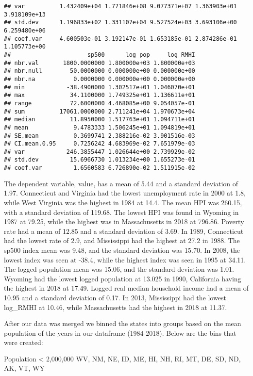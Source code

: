 \documentclass[
]{article}
\begin{document}
\begin{verbatim}
## var          1.432409e+04 1.771846e+08 9.077371e+07 1.363903e+01 3.918109e+13
## std.dev      1.196833e+02 1.331107e+04 9.527524e+03 3.693106e+00 6.259480e+06
## coef.var     4.600503e-01 3.192147e-01 1.653185e-01 2.874286e-01 1.105773e+00
##                      sp500      log_pop     log_RMHI
## nbr.val       1800.0000000 1.800000e+03 1.800000e+03
## nbr.null        50.0000000 0.000000e+00 0.000000e+00
## nbr.na           0.0000000 0.000000e+00 0.000000e+00
## min            -38.4900000 1.302517e+01 1.046070e+01
## max             34.1100000 1.749325e+01 1.136611e+01
## range           72.6000000 4.468085e+00 9.054057e-01
## sum          17061.0000000 2.711241e+04 1.970673e+04
## median          11.8950000 1.517763e+01 1.094711e+01
## mean             9.4783333 1.506245e+01 1.094819e+01
## SE.mean          0.3699741 2.388216e-02 3.901516e-03
## CI.mean.0.95     0.7256242 4.683969e-02 7.651979e-03
## var            246.3855447 1.026644e+00 2.739929e-02
## std.dev         15.6966730 1.013234e+00 1.655273e-01
## coef.var         1.6560583 6.726890e-02 1.511915e-02
\end{verbatim}

The dependent variable, value, has a mean of 5.44 and a standard
deviation of 1.97. Connecticut and Virginia had the lowest unemployment
rate in 2000 at 1.8, while West Virginia was the highest in 1984 at
14.4. The mean HPI was 260.15, with a standard deviation of 119.68. The
lowest HPI was found in Wyoming in 1987 at 79.25, while the highest was
in Massachusetts in 2018 at 796.86. Poverty rate had a mean of 12.85 and
a standard deviation of 3.69. In 1989, Connecticut had the lowest rate
of 2.9, and Mississippi had the highest at 27.2 in 1988. The sp500 index
mean was 9.48, and the standard deviation was 15.70. In 2008, the lowest
index was seen at -38.4, while the highest index was seen in 1995 at
34.11. The logged population mean was 15.06, and the standard deviation
was 1.01. Wyoming had the lowest logged population at 13.025 in 1990,
California having the highest in 2018 at 17.49. Logged real median
household income had a mean of 10.95 and a standard deviation of 0.17.
In 2013, Mississippi had the lowest log\_RMHI at 10.46, while
Massachusetts had the highest in 2018 at 11.37.

After our data was merged we binned the states into groups based on the
mean population of the years in our dataframe (1984-2018). Below are the
bins that were created:

Population \textless{} 2,000,000 WV, NM, NE, ID, ME, HI, NH, RI, MT, DE,
SD, ND, AK, VT, WY
\end{document}
